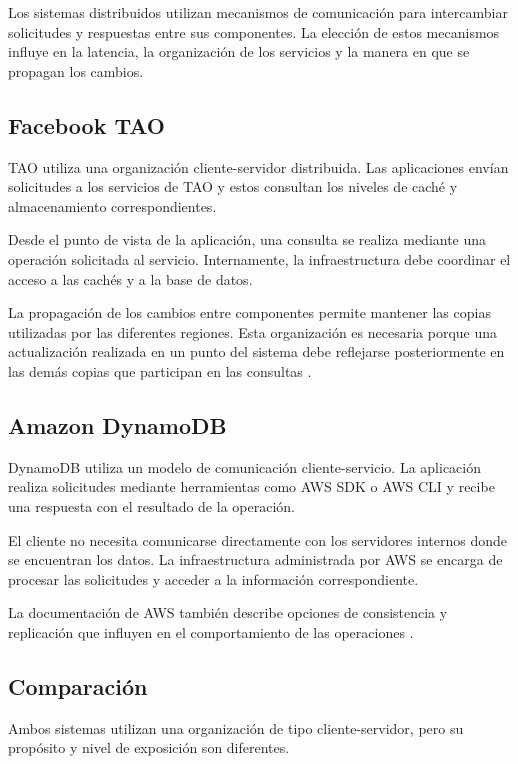 \documentclass[12pt,a4paper]{article}
\begin{document}
Los sistemas distribuidos utilizan mecanismos de comunicación para intercambiar solicitudes y respuestas entre sus componentes. La elección de estos mecanismos influye en la latencia, la organización de los servicios y la manera en que se propagan los cambios.

\subsection{Facebook TAO}

TAO utiliza una organización cliente-servidor distribuida. Las aplicaciones envían solicitudes a los servicios de TAO y estos consultan los niveles de caché y almacenamiento correspondientes.

Desde el punto de vista de la aplicación, una consulta se realiza mediante una operación solicitada al servicio. Internamente, la infraestructura debe coordinar el acceso a las cachés y a la base de datos.

La propagación de los cambios entre componentes permite mantener las copias utilizadas por las diferentes regiones. Esta organización es necesaria porque una actualización realizada en un punto del sistema debe reflejarse posteriormente en las demás copias que participan en las consultas \cite{bronson2013tao}.

\subsection{Amazon DynamoDB}

DynamoDB utiliza un modelo de comunicación cliente-servicio. La aplicación realiza solicitudes mediante herramientas como AWS SDK o AWS CLI y recibe una respuesta con el resultado de la operación.

El cliente no necesita comunicarse directamente con los servidores internos donde se encuentran los datos. La infraestructura administrada por AWS se encarga de procesar las solicitudes y acceder a la información correspondiente.

La documentación de AWS también describe opciones de consistencia y replicación que influyen en el comportamiento de las operaciones \cite{awsdynamodbconsistency,awsdynamodbglobaltables}.

\subsection{Comparación}

Ambos sistemas utilizan una organización de tipo cliente-servidor, pero su propósito y nivel de exposición son diferentes.
\end{document}
